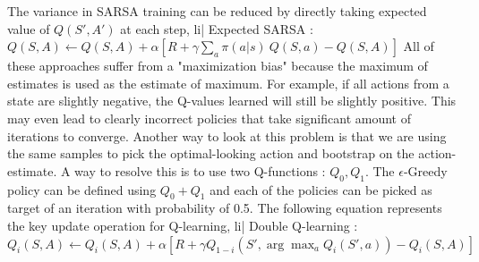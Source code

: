 The variance in SARSA training can be reduced by directly taking expected value of \( Q(S', A') \) at each step,
li| Expected SARSA : \( Q(S, A) \leftarrow Q(S, A) + \alpha[R + \gamma \sum_a \pi(a|s) \ Q(S, a) - Q(S,A)] \)
All of these approaches suffer from a "maximization bias" because the maximum of estimates is used as the estimate of maximum. For example, if all actions from a state are slightly negative, the Q-values learned will still be slightly positive. This may even lead to clearly incorrect policies that take significant amount of iterations to converge. Another way to look at this problem is that we are using the same samples to pick the optimal-looking action and bootstrap on the action-estimate.
A way to resolve this is to use two Q-functions : \( Q_0, Q_1 \). The \( \epsilon \)-Greedy policy can be defined using \( Q_0+Q_1 \) and each of the policies can be picked as target of an iteration with probability of 0.5. The following equation represents the key update operation for Q-learning,
li| Double Q-learning : \( Q_i(S, A) \leftarrow Q_i(S, A) + \alpha[R + \gamma Q_{1-i}(S', \arg\max_a Q_i(S', a)) - Q_i(S, A)] \)